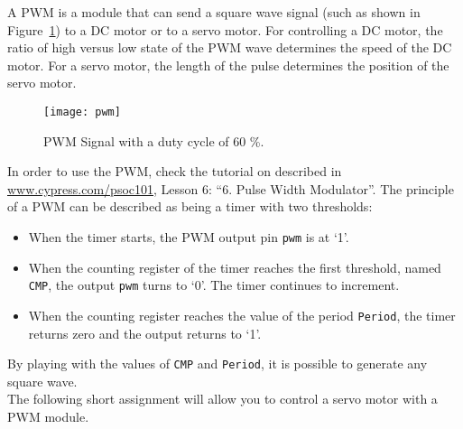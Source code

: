 A PWM is a module that can send a square wave signal (such as shown in Figure~\ref{fig:pwm}) to a DC motor or to a servo motor. For controlling a DC motor, the ratio of high versus low state of the PWM wave determines the speed of the DC motor. For a servo motor, the length of the pulse determines the position of the servo motor. 
\begin{figure}[h]
	\centering
	\texttt{[image: pwm]}
	\caption{PWM Signal with a duty cycle of 60 \%.}
	\label{fig:pwm}
\end{figure}
In order to use the PWM, check the tutorial on described in \url{www.cypress.com/psoc101}, Lesson 6: ``6. Pulse Width Modulator''. The principle of a PWM can be described as being a timer with two thresholds:
\begin{itemize}
	\item When the timer starts, the PWM output pin \texttt{pwm} is at ‘1’.
	\item When the counting register of the timer reaches the first threshold, named \texttt{CMP}, the output \texttt{pwm} turns to ‘0’.
	The timer continues to increment.
	\item When the counting register reaches the value of the period \texttt{Period}, the timer returns zero and the output returns to ‘1’.
\end{itemize}
By playing with the values of \texttt{CMP} and \texttt{Period}, it is possible to generate any square wave.
\\
The following short assignment will allow you to control a servo motor with a PWM module. 
